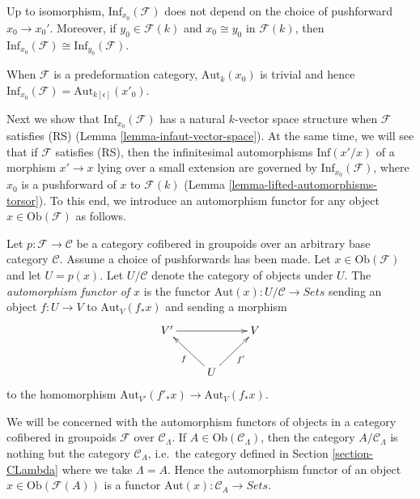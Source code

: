 \begin{remark}
\label{remark-choice-pushforward-immaterial-infinitesimal-aut}
Up to isomorphism, $\text{Inf}_{x_0}(\mathcal{F})$ does not depend on the 
choice of pushforward $x_0 \to x_0'$.  Moreover, if $y_0 \in \mathcal 
F(k)$ and $x_0 \cong y_0$ in $\mathcal{F}(k)$, then 
$\text{Inf}_{x_0}(\mathcal{F}) \cong \text{Inf}_{y_0}(\mathcal{F})$.
\end{remark}

\begin{remark}
\label{remark-trivial-aut-point}
When $\mathcal{F}$ is a predeformation category, $\text{Aut}_{k}(x_0)$ is 
trivial and hence $\text{Inf}_{x_0}(\mathcal{F}) = 
\text{Aut}_{k[\epsilon]}(x'_0)$.
\end{remark}

\noindent
Next we show that $\text{Inf}_{x_0}(\mathcal{F})$ has a natural $k$-vector 
space structure when $\mathcal{F}$ satisfies (RS) (Lemma 
\ref{lemma-infaut-vector-space}).  At the same time, we will see that if 
$\mathcal{F}$ satisfies (RS), then the infinitesimal automorphisms 
$\text{Inf}(x'/x)$ of a morphism $x' \to x$ lying over a small 
extension are governed by $\text{Inf}_{x_0}(\mathcal{F})$, where $x_0$ is 
a pushforward of $x$ to $\mathcal{F}(k)$ (Lemma 
\ref{lemma-lifted-automorphisms-torsor}).  To this end, we introduce an 
automorphism functor for any object $x \in \text{Ob}(\mathcal{F})$ as 
follows.

\begin{definition}
\label{definition-automorphism-functor}
Let $p: \mathcal{F} \to \mathcal{C}$ be a category cofibered in groupoids 
over an arbitrary base category $\mathcal{C}$. Assume a choice of pushforwards 
has been made.  Let $x \in \text{Ob}(\mathcal{F})$ and let $U = p(x)$.  
Let $U/\mathcal{C}$ denote the category of objects under $U$. The 
{\it automorphism functor of $x$} is the functor $\text{Aut}(x): 
U/\mathcal{C} \to \textit{Sets}$ sending an object $f: U 
\to V$ to $\text{Aut}_{V}(f_*x)$ and sending a morphism
\[
\xymatrix{
V' \ar[rr] &                    & V\\
          & U \ar[ul]^{f}  \ar[ur]_{f'} & 
}
\]
to the homomorphism $\text{Aut}_{V'}(f'_*x) \to 
\text{Aut}_{V}(f_*x)$.
\end{definition}

\noindent 
We will be concerned with the automorphism functors of objects in a category 
cofibered in groupoids $\mathcal{F}$ over $\mathcal{C}_\Lambda$.  If $A \in 
\text{Ob}(\mathcal{C}_\Lambda)$, then the category $A/\mathcal{C}_\Lambda$ is 
nothing but the category $\mathcal{C}_{A}$, i.e.\ the category defined in 
Section \ref{section-CLambda}
where we take $\Lambda = A$.  Hence the 
automorphism functor of an object $x \in \text{Ob}(\mathcal{F}(A))$ is a functor 
$\text{Aut}(x): \mathcal{C}_{A} \to \textit{Sets}$.

